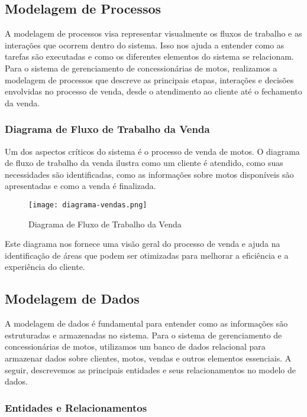 \subsection{Modelagem de Processos}

A modelagem de processos visa representar visualmente os fluxos de trabalho e as interações que ocorrem dentro do sistema. Isso nos ajuda a entender como as tarefas são executadas e como os diferentes elementos do sistema se relacionam. Para o sistema de gerenciamento de concessionárias de motos, realizamos a modelagem de processos que descreve as principais etapas, interações e decisões envolvidas no processo de venda, desde o atendimento ao cliente até o fechamento da venda.

\subsubsection{Diagrama de Fluxo de Trabalho da Venda}

Um dos aspectos críticos do sistema é o processo de venda de motos. O diagrama de fluxo de trabalho da venda ilustra como um cliente é atendido, como suas necessidades são identificadas, como as informações sobre motos disponíveis são apresentadas e como a venda é finalizada.

\begin{figure}[h]
	\centering
	\texttt{[image: diagrama-vendas.png]}
	\caption{Diagrama de Fluxo de Trabalho da Venda}
	\label{fig:Diagrama de Fluxo de Trabalho da Venda}
\end{figure}

Este diagrama nos fornece uma visão geral do processo de venda e ajuda na identificação de áreas que podem ser otimizadas para melhorar a eficiência e a experiência do cliente.

\subsection{Modelagem de Dados}

A modelagem de dados é fundamental para entender como as informações são estruturadas e armazenadas no sistema. Para o sistema de gerenciamento de concessionárias de motos, utilizamos um banco de dados relacional para armazenar dados sobre clientes, motos, vendas e outros elementos essenciais. A seguir, descrevemos as principais entidades e seus relacionamentos no modelo de dados.

\subsubsection{Entidades e Relacionamentos}

